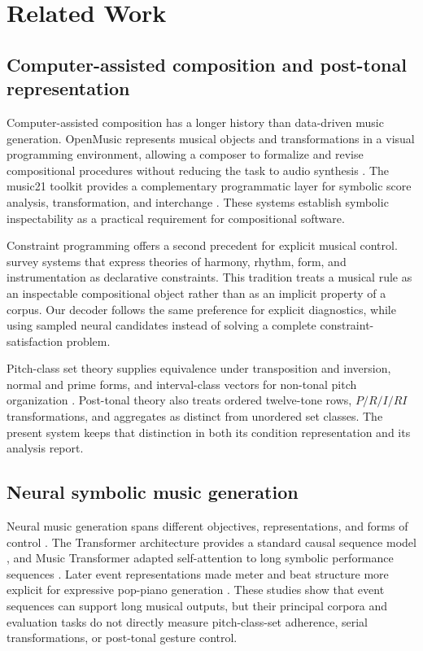 \section{Related Work}
\label{sec:related}

\subsection{Computer-assisted composition and post-tonal representation}

Computer-assisted composition has a longer history than data-driven music generation. OpenMusic represents musical objects and transformations in a visual programming environment, allowing a composer to formalize and revise compositional procedures without reducing the task to audio synthesis \citep{assayag1999openmusic}. The music21 toolkit provides a complementary programmatic layer for symbolic score analysis, transformation, and interchange \citep{cuthbert2010music21}. These systems establish symbolic inspectability as a practical requirement for compositional software.

Constraint programming offers a second precedent for explicit musical control. \citet{anders2011constraint} survey systems that express theories of harmony, rhythm, form, and instrumentation as declarative constraints. This tradition treats a musical rule as an inspectable compositional object rather than as an implicit property of a corpus. Our decoder follows the same preference for explicit diagnostics, while using sampled neural candidates instead of solving a complete constraint-satisfaction problem.

Pitch-class set theory supplies equivalence under transposition and inversion, normal and prime forms, and interval-class vectors for non-tonal pitch organization \citep{forte1973structure,straus2016posttonal}. Post-tonal theory also treats ordered twelve-tone rows, $P/R/I/RI$ transformations, and aggregates as distinct from unordered set classes. The present system keeps that distinction in both its condition representation and its analysis report.

\subsection{Neural symbolic music generation}

Neural music generation spans different objectives, representations, and forms of control \citep{briot2020deep}. The Transformer architecture provides a standard causal sequence model \citep{vaswani2017attention}, and Music Transformer adapted self-attention to long symbolic performance sequences \citep{huang2019musictransformer}. Later event representations made meter and beat structure more explicit for expressive pop-piano generation \citep{huang2020popmusic}. These studies show that event sequences can support long musical outputs, but their principal corpora and evaluation tasks do not directly measure pitch-class-set adherence, serial transformations, or post-tonal gesture control.

